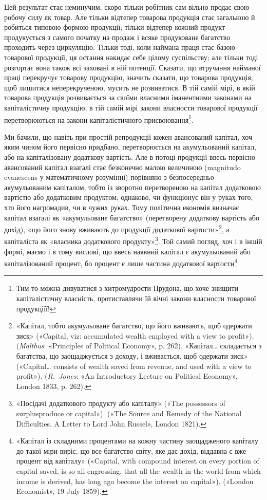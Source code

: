 
Цей результат стає неминучим, скоро тільки робітник сам
вільно продає свою робочу силу як товар. Але тільки відтепер товарова
продукція стає загальною й робиться типовою формою продукції;
тільки відтепер кожний продукт продукується з самого
початку на продаж і всяке продуковане багатство проходить через
циркуляцію. Тільки тоді, коли наймана праця стає базою товарової
продукції, ця остання накидає себе цілому суспільству;
але тільки тоді розгортає вона також всі заховані в ній потенції.
Сказати, що втручання найманої праці перекручує товарову
продукцію, значить сказати, що товарова продукція, щоб лишитися
неперекрученою, мусить не розвиватися. В тій самій мірі,
в якій товарова продукція розвивається за своїми власними
іманентними законами на капіталістичну продукцію, в тій самій
мірі закони власности товарової продукції перетворюються на
закони капіталістичного присвоювання\footnote{
Тим то можна дивуватися з хитромудрости Прудона, що хоче знищити
капіталістичну власність, протиставлячи їй вічні закони власности
товарової продукціїї!
}.

\label{original-499}Ми бачили, що навіть при простій репродукції кожен авансований
капітал, хоч яким чином його первісно придбано, перетворюється
на акумульований капітал, або на капіталізовану
додаткову вартість. Але в потоці продукції ввесь первісно авансований
капітал взагалі стає безконечно малою величиною (magnitudo
evanescens у математичному розумінні) порівняно з безпосередньо
акумульованим капіталом, тобто із зворотно перетвореною
на капітал додатковою вартістю або додатковим продуктом,
однаково, чи функціонує він у руках того, хто його нагромадив,
чи в чужих руках. Тому політична економія визначає капітал
взагалі як «акумульоване багатство» (перетворену додаткову
вартість або дохід), «що його знову вживають до продукції додаткової
вартости»\footnote{
«Капітал, тобто акумульоване багатство, що його вживають, щоб
одержати зиск» («Capital, viz: accumulated wealth employed with a
view to profit»). (\emph{Malthus}: «Principles of Political Economy», p. 262).
«Капітал\dots{} складається з багатства, що заощаджується з доходу, і вживається,
щоб одержати зиск» («Capital\dots{} consists of wealth saved from
revenue, and used with a view to profit»). (\emph{R.~Jones}: «An Introductory
Lecture on Political Economy», London 1833, p. 262).
}, а капіталіста як «власника додаткового
продукту»\footnote{
«Посідачі додаткового продукту або капіталу» («The possessors
of surplusproduce or capital»). («The Source and Remedy of the National
Difficulties. A Letter to Lord John Russel», London 1821).
}. Той самий погляд, хоч і в іншій формі, маємо і
в тому вислові, що ввесь наявний капітал є акумульований або
капіталізований процент, бо процент є лише частина додаткової
вартости\footnote{
«Капітал із складними процентами на кожну частину заощадженого
капіталу до такої міри виріс, що все багатство світу, яке дає дохід,
віддавна є вже процент від капіталу» («Capital, with compound interest
on every portion of capital saved, is so all engrossing, that all the wealth
in the world from which income is derived, has long ago become the
interest on capital»). («London Economist», 19 July 1859).
}
